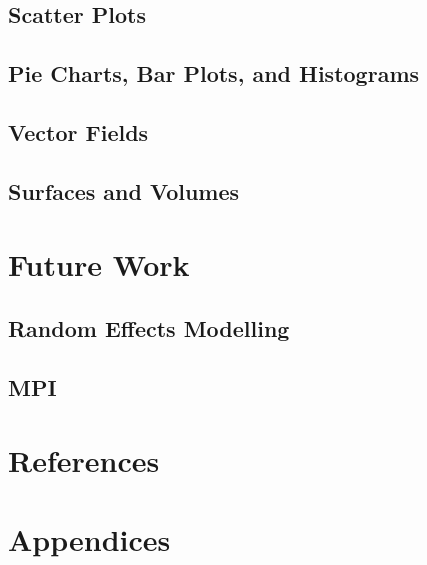 \documentclass[12pt,a4paper]{article}
\begin{document}
\subsection{Scatter Plots}
\subsection{Pie Charts, Bar Plots, and Histograms}
\subsection{Vector Fields}
\subsection{Surfaces and Volumes}
\section{Future Work}
\subsection{Random Effects Modelling}
\subsection{MPI}
\section{References}
\section{Appendices}
\end{document}
